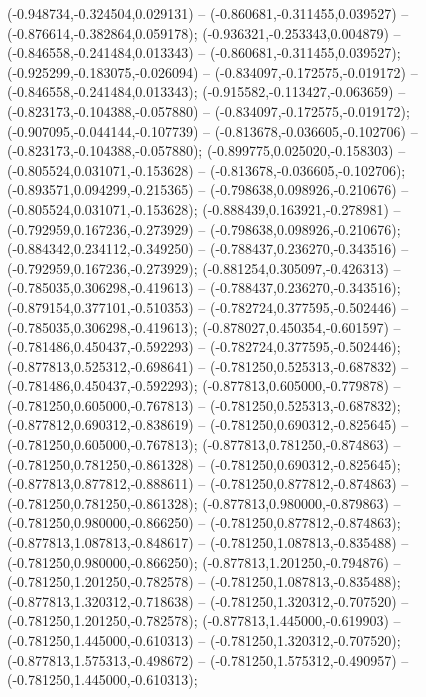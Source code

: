  (-0.948734,-0.324504,0.029131) -- (-0.860681,-0.311455,0.039527) -- (-0.876614,-0.382864,0.059178);
 (-0.936321,-0.253343,0.004879) -- (-0.846558,-0.241484,0.013343) -- (-0.860681,-0.311455,0.039527);
 (-0.925299,-0.183075,-0.026094) -- (-0.834097,-0.172575,-0.019172) -- (-0.846558,-0.241484,0.013343);
 (-0.915582,-0.113427,-0.063659) -- (-0.823173,-0.104388,-0.057880) -- (-0.834097,-0.172575,-0.019172);
 (-0.907095,-0.044144,-0.107739) -- (-0.813678,-0.036605,-0.102706) -- (-0.823173,-0.104388,-0.057880);
 (-0.899775,0.025020,-0.158303) -- (-0.805524,0.031071,-0.153628) -- (-0.813678,-0.036605,-0.102706);
 (-0.893571,0.094299,-0.215365) -- (-0.798638,0.098926,-0.210676) -- (-0.805524,0.031071,-0.153628);
 (-0.888439,0.163921,-0.278981) -- (-0.792959,0.167236,-0.273929) -- (-0.798638,0.098926,-0.210676);
 (-0.884342,0.234112,-0.349250) -- (-0.788437,0.236270,-0.343516) -- (-0.792959,0.167236,-0.273929);
 (-0.881254,0.305097,-0.426313) -- (-0.785035,0.306298,-0.419613) -- (-0.788437,0.236270,-0.343516);
 (-0.879154,0.377101,-0.510353) -- (-0.782724,0.377595,-0.502446) -- (-0.785035,0.306298,-0.419613);
 (-0.878027,0.450354,-0.601597) -- (-0.781486,0.450437,-0.592293) -- (-0.782724,0.377595,-0.502446);
 (-0.877813,0.525312,-0.698641) -- (-0.781250,0.525313,-0.687832) -- (-0.781486,0.450437,-0.592293);
 (-0.877813,0.605000,-0.779878) -- (-0.781250,0.605000,-0.767813) -- (-0.781250,0.525313,-0.687832);
 (-0.877812,0.690312,-0.838619) -- (-0.781250,0.690312,-0.825645) -- (-0.781250,0.605000,-0.767813);
 (-0.877813,0.781250,-0.874863) -- (-0.781250,0.781250,-0.861328) -- (-0.781250,0.690312,-0.825645);
 (-0.877813,0.877812,-0.888611) -- (-0.781250,0.877812,-0.874863) -- (-0.781250,0.781250,-0.861328);
 (-0.877813,0.980000,-0.879863) -- (-0.781250,0.980000,-0.866250) -- (-0.781250,0.877812,-0.874863);
 (-0.877813,1.087813,-0.848617) -- (-0.781250,1.087813,-0.835488) -- (-0.781250,0.980000,-0.866250);
 (-0.877813,1.201250,-0.794876) -- (-0.781250,1.201250,-0.782578) -- (-0.781250,1.087813,-0.835488);
 (-0.877813,1.320312,-0.718638) -- (-0.781250,1.320312,-0.707520) -- (-0.781250,1.201250,-0.782578);
 (-0.877813,1.445000,-0.619903) -- (-0.781250,1.445000,-0.610313) -- (-0.781250,1.320312,-0.707520);
 (-0.877813,1.575313,-0.498672) -- (-0.781250,1.575312,-0.490957) -- (-0.781250,1.445000,-0.610313);
